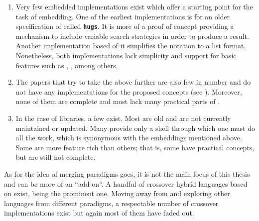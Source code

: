 \documentclass[thesis-solanki.tex]{subfiles}
\begin{document}
\begin{enumerate}
\item
  Very few embedded implementations exist which offer a starting point for the task of embedding.
  One of the earliest implementations \cite{website:mini-prolog-hugs98} is for an older specification of
   called  \texttt{\bfseries{hugs}}.
  It is more of a proof of concept providing a mechanism to include variable search strategies in order to produce
  a result.
  Another implementation \cite{website:takashi-workplace} based of it simplifies the notation to a list format.
  Nonetheless, both implementations lack simplicity and support for basic  features such as
  ,
  ,
  among others.

\begin{comment}
\item
  Only two embeddings exist, one of them is old and made for \texttt{\bfseries{hugs}} a functional programming
  system based on the \progLang{Haskell 98} specification.
  It is complex and also lacks a lot of \progLang{Prolog} like\eref{language-like} features including \textit{cuts, fails, assert}
  among others.
  The second one is based off the first one to make it simple but it loses the variable search strategy support
  which allows the programmer to choose the manner in which a solution is produced.
\end{comment}

\item
  The papers that try to take the above further are also few in number and do not have any implementations for the
  proposed concepts (see \cite{spivey1999embedding, seres1999algebra, seres2001algebra, spivey2000functional,
    seres2000optimisation}).
  Moreover, none of them are complete and most lack many practical parts of .

\item
  In the case of libraries, a few exist.
  Most are old and are not currently maintained or updated.
  Many provide only a shell through which one must do all the work, which is synonymous with
  the embeddings mentioned above.
  Some are more feature rich than others; that is, some have practical  concepts,
  but are still not complete.

\end{enumerate}

As for the idea of merging paradigms goes, it is not the main focus of this thesis and can be more of an
``add-on''.
A handful of crossover hybrid languages based on  exist,
 \cite{website:curry} being the prominent one.
Moving away from  and exploring other languages from different paradigms, a respectable number of
crossover implementations exist but again most of them have faded out.
\end{document}
